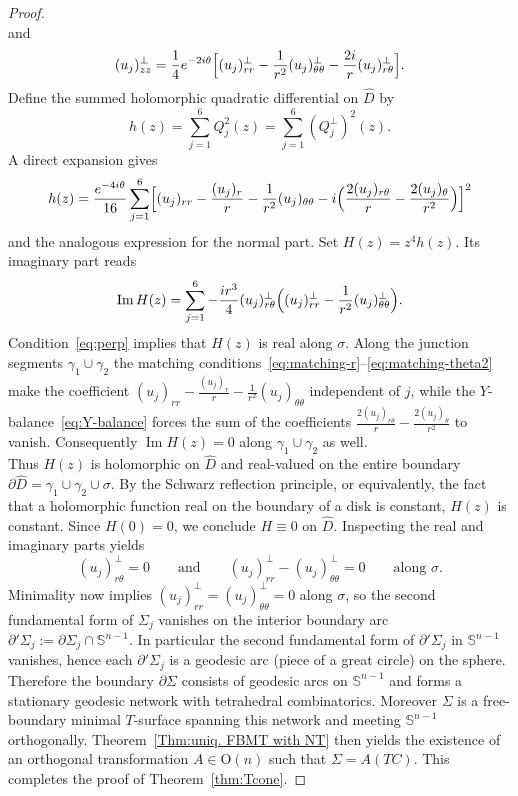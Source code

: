 \documentclass[11pt]{amsart}
\numberwithin{equation}{section}
\theoremstyle{theorem}
\theoremstyle{definition}
\numberwithin{equation}{section}
\begin{document}
\begin{proof}
\[\]
and
\[
(u_j)_{zz}^\perp=\frac14 e^{-2i\theta}\Bigl[(u_j)_{rr}^\perp-\frac1{r^2}(u_j)_{\theta\theta}^\perp-\frac{2i}{r}(u_j)_{r\theta}^\perp\Bigr].
\]
Define the summed holomorphic quadratic differential on $\hat{D}$ by
\[
h(z)=\sum_{j=1}^6 Q_j^2(z)=\sum_{j=1}^6(Q_j^\perp)^2(z).
\]
A direct expansion gives
\[
h(z)=\frac{e^{-4i\theta}}{16}\sum_{j=1}^6\Bigl[(u_j)_{rr}-\frac{(u_j)_r}{r}-\frac1{r^2}(u_j)_{\theta\theta}-i\Bigl(\frac{2(u_j)_{r\theta}}{r}-\frac{2(u_j)_\theta}{r^2}\Bigr)\Bigr]^2
\]
and the analogous expression for the normal part. Set $H(z)=z^4 h(z)$. Its imaginary part reads
\[
\operatorname{Im} H(z)=\sum_{j=1}^6-\frac{ir^3}{4}(u_j)_{r\theta}^\perp\Bigl((u_j)_{rr}^\perp-\frac1{r^2}(u_j)_{\theta\theta}^\perp\Bigr).
\]
Condition~\eqref{eq:perp} implies that $H(z)$ is real along $\sigma$. Along the junction segments $\gamma_1\cup\gamma_2$ the matching conditions~\eqref{eq:matching-r}--\eqref{eq:matching-theta2} make the coefficient $(u_j)_{rr}-\frac{(u_j)_r}{r}-\frac1{r^2}(u_j)_{\theta\theta}$ independent of $j$, while the $Y$-balance~\eqref{eq:Y-balance} forces the sum of the coefficients $\frac{2(u_j)_{r\theta}}{r}-\frac{2(u_j)_\theta}{r^2}$ to vanish. Consequently $\operatorname{Im} H(z)=0$ along $\gamma_1\cup\gamma_2$ as well.\\

Thus $H(z)$ is holomorphic on $\hat{D}$ and real-valued on the entire boundary $\partial\hat{D}=\gamma_1\cup\gamma_2\cup\sigma$. By the Schwarz reflection principle, or equivalently, the fact that a holomorphic function real on the boundary of a disk is constant, $H(z)$ is constant. Since $H(0)=0$, we conclude $H\equiv0$ on $\hat{D}$. Inspecting the real and imaginary parts yields
\[
(u_j)_{r\theta}^\perp=0\qquad\text{and}\qquad(u_j)_{rr}^\perp-(u_j)_{\theta\theta}^\perp=0\qquad\text{along }\sigma.
\]
Minimality now implies $(u_j)_{rr}^\perp=(u_j)_{\theta\theta}^\perp=0$ along $\sigma$, so the second fundamental form of $\Sigma_j$ vanishes on the interior boundary arc $\partial'\Sigma_j:=\partial\Sigma_j\cap\mathbb{S}^{n-1}$. In particular the second fundamental form of $\partial'\Sigma_j$ in $\mathbb{S}^{n-1}$ vanishes, hence each $\partial'\Sigma_j$ is a geodesic arc (piece of a great circle) on the sphere.\\
Therefore the boundary $\partial\Sigma$ consists of geodesic arcs on $\mathbb{S}^{n-1}$ and forms a stationary geodesic network with tetrahedral combinatorics. Moreover $\Sigma$ is a free-boundary minimal $T$-surface spanning this network and meeting $\mathbb{S}^{n-1}$ orthogonally. Theorem~\ref{Thm:uniq. FBMT with NT} then yields the existence of an orthogonal transformation $A\in\mathrm{O}(n)$ such that $\Sigma=A(TC)$. This completes the proof of Theorem~\ref{thm:Tcone}.
\end{proof}
\end{document}
